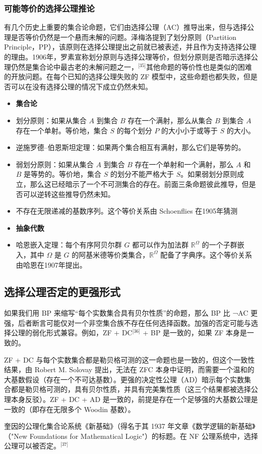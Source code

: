 \subsubsection{可能等价的选择公理推论}  
有几个历史上重要的集合论命题，它们由选择公理（AC）推导出来，但与选择公理是否等价仍然是一个悬而未解的问题。泽梅洛提到了划分原则（Partition Principle，PP），该原则在选择公理提出之前就已被表述，并且作为支持选择公理的理由。1906年，罗素宣称划分原则与选择公理等价，但划分原则是否暗示选择公理仍然是集合论中最古老的未解问题之一，\(^\text{[35]}\)其他命题的等价性也是类似的困难的开放问题。在每个已知的选择公理失败的 ZF 模型中，这些命题也都失败，但是否可以在没有选择公理的情况下成立仍然未知。
\begin{itemize}
\item \textbf{集合论}  
\item 划分原则：如果从集合 \(A\) 到集合 \(B\) 存在一个满射，那么从集合 \(B\) 到集合 \(A\) 存在一个单射。等价地，集合 \(S\) 的每个划分 \(P\) 的大小小于或等于 \(S\) 的大小。  
\item 逆施罗德–伯恩斯坦定理：如果两个集合相互有满射，那么它们是等势的。  
\item 弱划分原则：如果从集合 \(A\) 到集合 \(B\) 存在一个单射和一个满射，那么 \(A\) 和 \(B\) 是等势的。等价地，集合 \(S\) 的划分不能严格大于 \(S\)。如果弱划分原则成立，那么这已经暗示了一个不可测集合的存在。前面三条命题彼此推导，但是否可以逆转这些推导仍然未知。  
\item 不存在无限递减的基数序列。这个等价关系由 Schoenflies 在1905年猜测
\end{itemize}
\begin{itemize}
\item \textbf{抽象代数}  
\item 哈恩嵌入定理：每个有序阿贝尔群 \(G\) 都可以作为加法群 \(\mathbb{R}^\Omega\) 的一个子群嵌入，其中 \(\Omega\) 是 \(G\) 的阿基米德等价类集合，\(\mathbb{R}^\Omega\) 配备了字典序。这个等价关系由哈恩在1907年提出。
\end{itemize}
\subsection{选择公理否定的更强形式}  
如果我们用 BP 来缩写“每个实数集合具有贝尔性质”的命题，那么 BP 比 ¬AC 更强，后者断言可能仅对一个非空集合族不存在任何选择函数。加强的否定可能与选择公理的弱化形式兼容。例如，ZF + DC\(^\text{[36]}\) + BP 是一致的，如果 ZF 本身是一致的。

ZF + DC 与每个实数集合都是勒贝格可测的这一命题也是一致的，但这个一致性结果，由 Robert M. Solovay 提出，无法在 ZFC 本身中证明，而需要一个温和的大基数假设（存在一个不可达基数）。更强的决定性公理（AD）暗示每个实数集合都是勒贝格可测的，具有贝尔性质，并具有完美集性质（这三个结果都被选择公理本身反驳）。ZF + DC + AD 是一致的，前提是存在一个足够强的大基数公理是一致的（即存在无限多个 Woodin 基数）。

奎因的公理化集合论系统《新基础》（得名于其 1937 年文章《数学逻辑的新基础》（"New Foundations for Mathematical Logic"）的标题。在 NF 公理系统中，选择公理可以被否定。\(^\text{[37]}\)